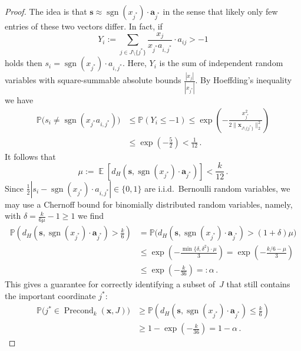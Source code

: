 \documentclass[12pt]{article}
\theoremstyle{plain}
\theoremstyle{definition}
\renewcommand{\P}{{\mathbb P}}
\newcommand{\expect}{\operatorname{\mathbb{E}}}
\DeclareMathOperator{\sgn}{sgn}
\renewcommand{\vec}{\boldsymbol}
\DeclareMathOperator{\precond}{Precond}
\begin{document}
\begin{proof}
    The idea is that $\vec{s} \approx \sgn(x_{j^\ast}) \cdot \vec{a}_{j^\ast}$
    in the sense that likely only few entries of these two vectors differ.
    In fact, if
    \begin{equation*}
        Y_i := \sum_{j \in J \setminus\{j^\ast\}} 
                    \frac{x_j}{x_{j^\ast}a_{i,j^\ast}} \cdot a_{ij}
            > -1
    \end{equation*}
    holds then $s_i = \sgn(x_{j^\ast}) \cdot a_{i,j^\ast}$.
    Here, $Y_i$ is the sum of independent random variables with square-summable absolute bounds $\frac{|x_j|}{|x_{j^\ast}|}$. By Hoeffding's inequality we have
    \begin{align*}
        \P\bigl(s_i \neq \sgn(x_{j^\ast} a_{i,j^\ast})\bigr)
            &\leq \P(Y_i \leq -1)
            \leq \exp\left(-\frac{x_{j^\ast}^2}{2\|\vec{x}_{J\setminus\{j^\ast\}}\|_2^2}\right)
            \\
            &\leq \exp\left(-\frac{5}{2}\right) < \frac{1}{12} \,.
    \end{align*}
    It follows that
    \begin{equation*}
        \mu := \expect \left[d_H(\vec{s}, \sgn(x_{j^\ast}) \cdot \vec{a}_{j^\ast})\right]
            < \frac{k}{12} \,.
    \end{equation*}
    Since 
    $\frac{1}{2}|s_i - \sgn(x_{j^\ast}) \cdot a_{i,j^\ast}| \in \{0,1\}$
    are i.i.d.\ Bernoulli random variables,
    we may use a Chernoff bound for binomially distributed random variables,
    namely, with $\delta = \frac{k}{6\mu} - 1 \geq 1$ we find
    \begin{align*}
        \P\left(d_H(\vec{s}, \sgn(x_{j^\ast}) \cdot \vec{a}_{j^\ast})
                > \frac{k}{6}\right)
            &= \P\bigl(d_H(\vec{s}, \sgn(x_{j^\ast}) \cdot \vec{a}_{j^\ast})
                > (1+\delta)\mu\bigr) \\
            &\leq \exp\left(- \frac{\min\{\delta,\delta^2\} \cdot \mu}{3}\right)
            = \exp\left(- \frac{k/6 - \mu}{3}\right) \\
            &\leq \exp\left(-\frac{k}{36}\right) =: \alpha \,.
    \end{align*}
    This gives a guarantee for correctly identifying a subset of~$J$ that still contains the important coordinate $j^\ast$:
    \begin{align}
        \P\bigl(j^\ast \in \precond_k(\vec{x},J)\bigr)
            &\geq \P\left(d_H(\vec{s}, \sgn(x_{j^\ast}) \cdot \vec{a}_{j^\ast})
                \leq \frac{k}{6}\right)
                \nonumber \\
            &\geq 1 - \exp\left(-\frac{k}{36}\right)
            = 1 - \alpha \,.
            \label{eq:precondtrue}
    \end{align}


\end{proof}
\end{document}
